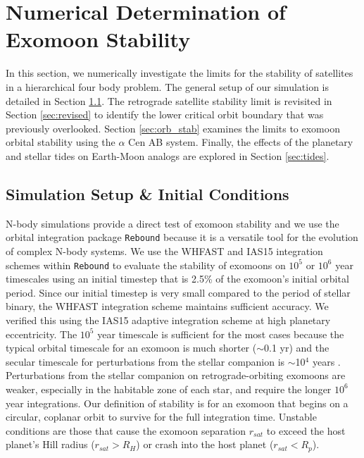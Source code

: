 \documentclass[preprint]{aastex63}
\begin{document}
\section{Numerical Determination of Exomoon Stability} \label{sec:numerical}
In this section, we numerically investigate the limits for the stability of satellites in a hierarchical four body problem.  The general setup of our simulation is detailed in Section \ref{sec:setup}.  The retrograde satellite stability limit \citep{Domingos2006} is revisited in Section \ref{sec:revised} to identify the lower critical orbit boundary that was previously overlooked.  Section \ref{sec:orb_stab} examines the limits to exomoon orbital stability using the $\alpha$ Cen AB system.  Finally, the effects of the planetary and stellar tides on Earth-Moon analogs are explored in Section \ref{sec:tides}.

\subsection{Simulation Setup \& Initial Conditions}\label{sec:setup}

N-body simulations provide a direct test of exomoon stability and we use the orbital integration package \texttt{Rebound} \citep{Rein2012,Rein2015} because it is a versatile tool for the evolution of complex N-body systems.  We use the WHFAST and IAS15 integration schemes within \texttt{Rebound} to evaluate the stability of exomoons \citep[i.e.,][]{Rosario-Franco2020} on $10^5$ or $10^6$ year timescales using an initial timestep that is 2.5\% of the exomoon's initial orbital period.  {Since our initial timestep is very small compared to the period of stellar binary, the WHFAST integration scheme maintains sufficient accuracy.  We verified this using the IAS15 adaptive integration scheme at high planetary eccentricity.}  The $10^5$ year timescale is sufficient for the most cases because the typical orbital timescale for an exomoon is much shorter ($\sim$0.1 yr) and the secular timescale for perturbations from the stellar companion is $\sim$10$^4$ years \citep[e.g., $\alpha$ Centauri AB;][]{Quarles2018a,Quarles2018b,Quarles2019}.  Perturbations from the stellar companion on retrograde-orbiting exomoons are weaker, especially in the habitable zone of each star, and require the longer $10^6$ year integrations.  Our definition of stability is for an exomoon that begins on a circular, coplanar orbit to survive for the full integration time.  Unstable conditions are those that cause the exomoon separation $r_{sat}$ to exceed the host planet's Hill radius ($r_{sat} > R_H$) or crash into the host planet ($r_{sat}<R_p$).
\end{document}
